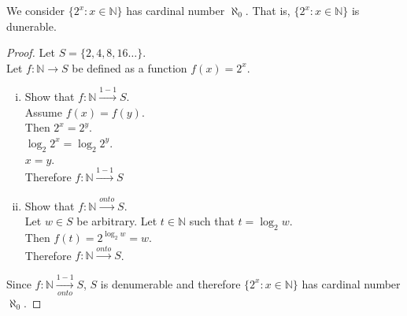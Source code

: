 \documentclass[a4paper,11pt]{article}
\begin{document}
\begin{theorem1}
We consider \(\{2^{x}: x \in 
\mathbb{N}\}\) has cardinal number \(\aleph_{0}\). That is, \(\{2^{x}: x \in 
\mathbb{N}\}\) is dunerable.
\begin{proof}
Let \(S = \{2,4,8,16 \ldots\}\).\\
Let \(f: \mathbb{N} \rightarrow S\) be defined as a function \(f{(x)}=2^{x}\).
\begin{enumerate}[(i)]
  \item Show that \(f:\mathbb{N} \xrightarrow{1-1} S\).\\
  Assume \(f{(x)} = 
  f{(y)}\).\\
  Then \(2^{x} = 2^{y}\).\\ \(\log_{2}2^{x} = \log_{2}2^{y}\).\\ \(x=y\).\\
  Therefore \(f:\mathbb{N} \xrightarrow{1-1} S\)
  \item Show that \(f:\mathbb{N} \xrightarrow{onto} S\).\\
  Let \(w \in S\) be arbitrary. Let \(t \in \mathbb{N}\) such that \(t = 
  \log_2{w}\).\\
  Then \(f{(t)} = 2^{\log_{2}w} = w\).\\
  Therefore \(f:\mathbb{N} \xrightarrow{onto} S\).
\end{enumerate}
Since \(f:\mathbb{N} \xrightarrow[onto]{1-1} S\), \(S\) is denumerable and 
therefore \(\{2^{x}: x \in 
\mathbb{N}\}\) has cardinal number \(\aleph_{0}\).
\end{proof}
\end{theorem1}
\end{document}
